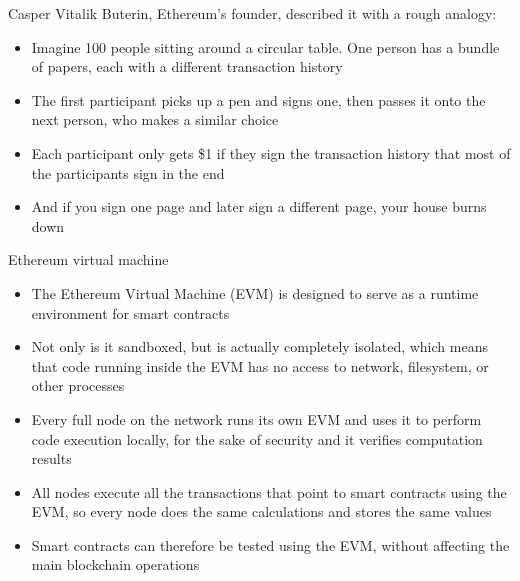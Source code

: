 \documentclass[10pt]{beamer}
\begin{document}


\begin{frame}{Casper}
	Vitalik Buterin, Ethereum's founder, described it with a rough analogy:
	\begin{itemize}
		\item Imagine 100 people sitting around a circular table. One person has a bundle of papers, each with a different transaction history
		\item The first participant picks up a pen and signs one, then passes it onto the next person, who makes a similar choice
		\item Each participant only gets \$1 if they sign the transaction history that most of the participants sign in the end
		\item And if you sign one page and later sign a different page, your house burns down
	\end{itemize}
\end{frame}


\begin{frame}{Ethereum virtual machine}
	\begin{itemize}
		\item The Ethereum Virtual Machine (EVM) is designed to serve as a runtime environment for smart contracts
		\item Not only is it sandboxed, but is actually completely isolated, which means that code running inside the EVM has no access to network, filesystem, or other processes
		\item Every full node on the network runs its own EVM and uses it to perform code execution locally, for the sake of security and it verifies computation results
		\item All nodes execute all the transactions that point to smart contracts using the EVM, so every node does the same calculations and stores the same values
		\item Smart contracts can therefore be tested using the EVM, without affecting the main blockchain operations
	\end{itemize}
\end{frame}

\end{document}
